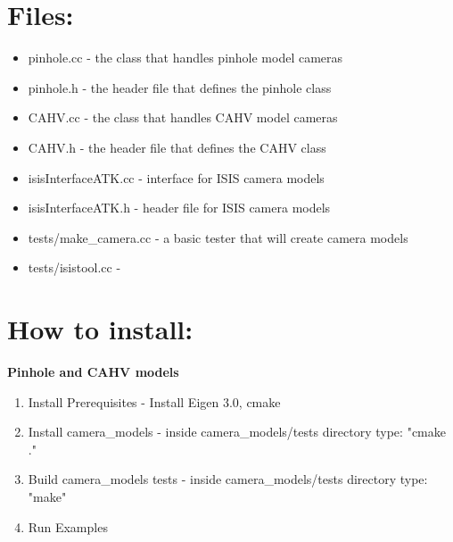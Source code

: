\documentclass[float=false, crop=false]{standalone}
\begin{document}
\section{Files:}

\begin{itemize}

	\item{pinhole.cc - the class that handles pinhole model cameras}
	\item{pinhole.h - the header file that defines the pinhole class}
	\item{CAHV.cc - the class that handles CAHV model cameras}
	\item{CAHV.h - the header file that defines the CAHV class}
	\item{isisInterfaceATK.cc - interface for ISIS camera models}
	\item{isisInterfaceATK.h - header file for ISIS camera models}
	\item{tests/make\_camera.cc - a basic tester that will create camera models}
	\item{tests/isistool.cc - }

\end{itemize}

\section{How to install:}
{\bf Pinhole and CAHV models}
\begin{enumerate}
	\item{Install Prerequisites - Install Eigen 3.0, cmake}
	\item{Install camera\_models - inside camera\_models/tests directory type: "cmake ." }
	\item{Build camera\_models tests - inside camera\_models/tests directory type: "make" }
	\item{Run Examples}
\end{enumerate}
\end{document}
